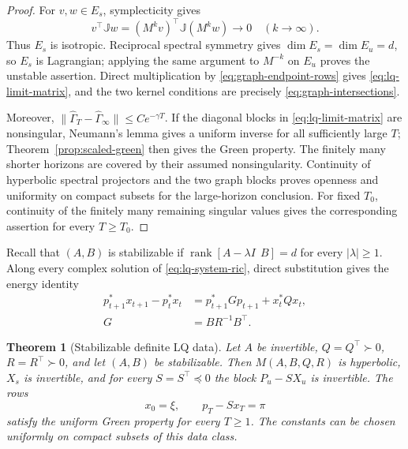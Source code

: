 \documentclass[twocolumn,nameyear,amsthm]{autart}
\newcommand{\Jc}{\mathbb J}
\numberwithin{equation}{section}
\newtheorem{theorem}{Theorem}[section]
\begin{document}
\begin{proof}
For $v,w\in E_s$, symplecticity gives
\[
 v^\top\Jc w=(M^kv)^\top\Jc(M^kw)\longrightarrow0
 \quad (k\to\infty).
\]
Thus $E_s$ is isotropic.  Reciprocal spectral symmetry gives
$\dim E_s=\dim E_u=d$, so $E_s$ is Lagrangian; applying the same argument to
$M^{-k}$ on $E_u$ proves the unstable assertion.  Direct multiplication by
\eqref{eq:graph-endpoint-rows} gives \eqref{eq:lq-limit-matrix}, and the two
kernel conditions are precisely \eqref{eq:graph-intersections}.

Moreover,
$\|\widehat\Gamma_T-\widehat\Gamma_\infty\|\le Ce^{-\gamma T}$.
If the diagonal blocks in \eqref{eq:lq-limit-matrix} are nonsingular,
Neumann's lemma gives a uniform inverse for all sufficiently large $T$;
Theorem~\ref{prop:scaled-green} then gives the Green property.  The finitely
many shorter horizons are covered by their assumed nonsingularity.
Continuity of hyperbolic spectral projectors and the two graph blocks proves
openness and uniformity on compact subsets for the large-horizon conclusion.  For fixed
$T_0$, continuity of the finitely many remaining singular values gives the
corresponding assertion for every $T\ge T_0$.
\end{proof}

Recall that $(A,B)$ is stabilizable if
$\operatorname{rank}[A-\lambda I\ \ B]=d$ for every $|\lambda|\ge1$.
Along every complex solution of \eqref{eq:lq-system-ric}, direct substitution
gives the energy identity
\begin{equation}\label{eq:energy}
\begin{aligned}
      p_{t+1}^*x_{t+1}-p_t^*x_t
      &=p_{t+1}^*Gp_{t+1}+x_t^*Qx_t,\\
      G&=BR^{-1}B^\top .
\end{aligned}
\end{equation}

\begin{theorem}[Stabilizable definite LQ data]\label{thm:lq}
Let $A$ be invertible, $Q=Q^\top\succ0$, $R=R^\top\succ0$, and let
$(A,B)$ be stabilizable.  Then $M(A,B,Q,R)$ is hyperbolic, $X_s$ is
invertible, and for every $S=S^\top\preceq0$ the block $P_u-SX_u$ is
invertible.  The rows
\[
       x_0=\xi,\qquad p_T-Sx_T=\pi
\]
satisfy the uniform Green property for every $T\ge1$.  The constants can be
chosen uniformly on compact subsets of this data class.
\end{theorem}
\end{document}

